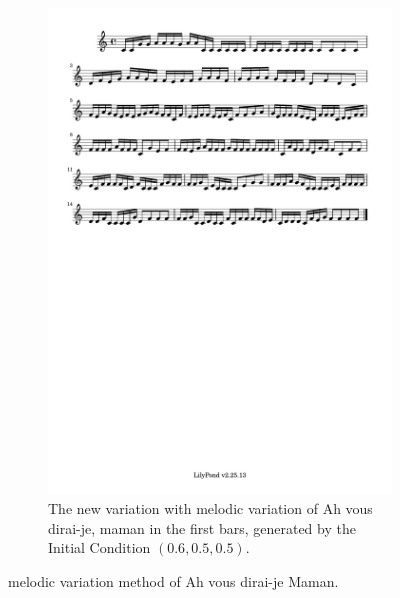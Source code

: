 \documentclass[11pt]{article}
\theoremstyle{definition}
\begin{document}
\begin{figure}
\begin{subfigure}{\textwidth}
\centering
\includegraphics[trim=1cm 26.5cm 8.65cm 0.5cm, clip, scale=1]{dabby_melody_variation.pdf}
\caption{The new variation with melodic variation of Ah vous dirai-je, maman in the first bars, generated by the Initial Condition $(0.6, 0.5, 0.5)$.} 
\label{fig:DabbyER2}
\end{subfigure}
\caption{melodic variation method of Ah vous dirai-je Maman.}
\end{figure}
\end{document}
